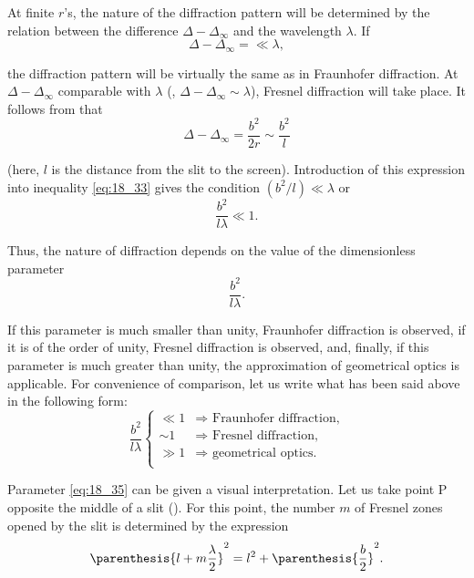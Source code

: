 At finite $r$'s, the nature of the diffraction pattern will be determined by the relation between the difference $\Delta-\Delta_{\infty}$ and the wavelength $\lambda$.
If
\begin{equation}\label{eq:18_33}
	\Delta-\Delta_{\infty} = \ll \lambda,
\end{equation}

\noindent
the diffraction pattern will be virtually the same as in Fraunhofer diffraction.
At $\Delta-\Delta_{\infty}$ comparable with $\lambda$ (\ie, $\Delta-\Delta_{\infty}\sim \lambda$), Fresnel diffraction will take place.
It follows from  that
\begin{equation*}
	\Delta-\Delta_{\infty} = \frac{b^2}{2r} \sim \frac{b^2}{l}
\end{equation*}

\noindent
(here, $l$ is the distance from the slit to the screen).
Introduction of this expression into inequality \eqref{eq:18_33} gives the condition $(b^2/l)\ll\lambda$ or
\begin{equation}\label{eq:18_34}
	\frac{b^2}{l\lambda} \ll 1.
\end{equation}

\noindent
Thus, the nature of diffraction depends on the value of the dimensionless parameter
\begin{equation}\label{eq:18_35}
	\frac{b^2}{l\lambda}.
\end{equation}

If this parameter is much smaller than unity, Fraunhofer diffraction is observed, if it is of the order of unity, Fresnel diffraction is observed, and, finally, if this parameter is much greater than unity, the approximation of geometrical optics is applicable.
For convenience of comparison, let us write what has been said above in the following form:
\begin{equation}\label{eq:18_36}
	\frac{b^2}{l\lambda}
	\begin{cases}
		\ll 1 & \Rightarrow \text{ Fraunhofer diffraction,}\\
		\sim 1 & \Rightarrow \text{ Fresnel diffraction,}\\
		\gg 1 & \Rightarrow \text{ geometrical optics.}\\
	\end{cases}
\end{equation}

Parameter \eqref{eq:18_35} can be given a visual interpretation.
Let us take point P opposite the middle of a slit ().
For this point, the number $m$ of Fresnel zones opened by the slit is determined by the expression
\begin{equation*}
	\parenthesis{l + m \frac{\lambda}{2}}^2 = l^2 + \parenthesis{\frac{b}{2}}^2.
\end{equation*}

